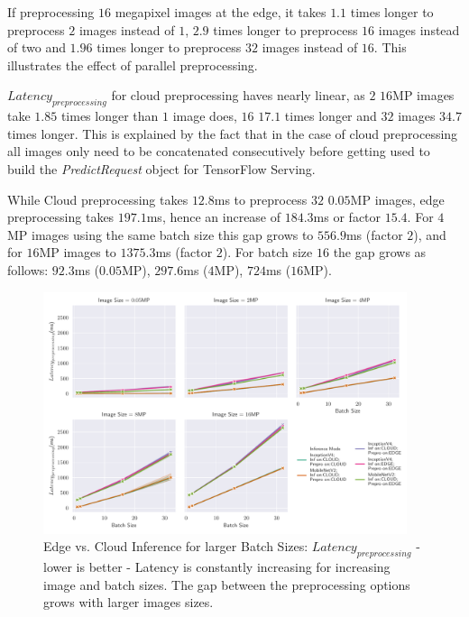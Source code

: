 If preprocessing $16$ megapixel images at the edge, it takes $1.1$ times longer to preprocess $2$ images instead of $1$, $2.9$ times longer to preprocess $16$ images instead of two and $1.96$ times longer to preprocess $32$ images instead of $16$.
This illustrates the effect of parallel preprocessing.

$Latency_{preprocessing}$ for cloud preprocessing haves nearly linear, as $2$ $16$MP images take $1.85$ times longer than $1$ image does, $16$ $17.1$ times longer and $32$ images $34.7$ times longer.
This is explained by the fact that in the case of cloud preprocessing all images only need to be concatenated consecutively before getting used to build the \emph{PredictRequest} object for TensorFlow Serving. 


While Cloud preprocessing takes $12.8$ms to preprocess $32$ $0.05$MP images, edge preprocessing takes $197.1$ms, hence an increase of $184.3$ms or factor $15.4$. For $4$MP images using the same batch size this gap grows to $556.9$ms (factor $2$), and for $16$MP images to $1375.3$ms (factor $2$).
For batch size $16$ the gap grows as follows: $92.3$ms ($0.05$MP), $297.6$ms ($4$MP), $724$ms ($16$MP).


\begin{figure}[!htb]
\centering
\includegraphics[width=0.95\textwidth]{./Bilder/single_plots/batch_size_plots/Effects_of_Batch_size_Preprocessing_Latencies.pdf}
\caption[Edge vs. Cloud Inference for larger Batch Sizes:  $Latency_{preprocessing}$ - lower is better]{Edge vs. Cloud Inference for larger Batch Sizes:  $Latency_{preprocessing}$ - lower is better - Latency is constantly increasing for increasing image and batch sizes. The gap between the preprocessing options grows with larger images sizes.}
\label{fig:BatchSizePreproLatency}
\end{figure}



